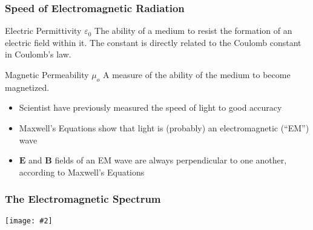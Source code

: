 \documentclass[compress,aspectratio=169]{beamer}
\newcommand{\pic}[2]{\texttt{[image: \#2]}}
\newcommand{\mb}[1]{\mathbf{#1}}
\begin{document}
\begin{frame}
  \frametitle{Speed of Electromagnetic Radiation}
  \begin{block}{Electric Permittivity $\varepsilon_0$}
    The ability of a medium to resist the formation of an electric field within
    it. The constant is directly related to the Coulomb constant in Coulomb's
    law. 
  \end{block}
  \vspace{0.1in}
  \begin{block}{Magnetic Permeability $\mu_o$}
    A measure of the ability of the medium to become magnetized.
  \end{block}

  \begin{itemize}
  \item Scientist have previously measured the speed of light to good accuracy
  \item Maxwell's Equations show that light is (probably) an electromagnetic
    (``EM'') wave
  \item $\mb{E}$ and $\mb{B}$ fields of an EM wave are always perpendicular to
    one another, according to Maxwell's Equations
  \end{itemize}
\end{frame}


\begin{frame}
  \frametitle{The Electromagnetic Spectrum}
  \begin{center}
    \pic{1}{graphics/electromagneticspectrum-141b490bac872789434.jpg}
  \end{center}
\end{frame}


\end{document}
